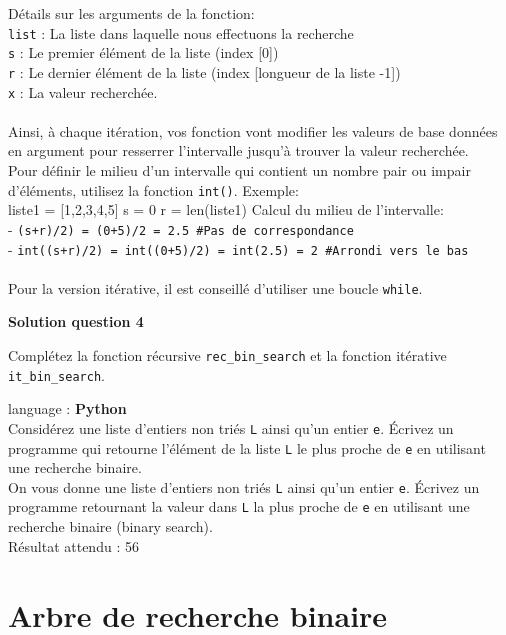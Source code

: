 \begin{Exercice}[10-15 minutes]
\begin{conseil}
        Détails sur les arguments de la fonction:\\
        \lstinline{list} : La liste dans laquelle nous effectuons la recherche\\
        \lstinline{s} : Le premier élément de la liste (index [0])\\
        \lstinline{r} : Le dernier élément de la liste (index [longueur de la liste -1])\\
        \lstinline{x} : La valeur recherchée.\\\\

        Ainsi, à chaque itération, vos fonction vont modifier les valeurs de base données en argument pour resserrer l'intervalle jusqu'à trouver la valeur recherchée.\\        
        Pour définir le milieu d'un intervalle qui contient un nombre pair ou impair d'éléments, utilisez la fonction \lstinline{int()}. Exemple:\\
        liste1 = [1,2,3,4,5]
        s = 0 \quad r = len(liste1)
        Calcul du milieu de l'intervalle:\\
        - \lstinline{(s+r)/2) = (0+5)/2 = 2.5 #Pas de correspondance}\\
        - \lstinline{int((s+r)/2) = int((0+5)/2) = int(2.5) = 2 #Arrondi vers le bas}\\\\
        
        Pour la version itérative, il est conseillé d'utiliser une boucle \lstinline{while}.

    \end{conseil}

    \textbf{Solution question 4}

    Complétez la fonction récursive \lstinline{rec_bin_search} et la fonction itérative \lstinline{it_bin_search}. 
    
    


\end{Exercice}


\begin{Exercice}[10 minutes] language : \textbf{Python}\\

Considérez une liste d’entiers non triés \lstinline{L} ainsi qu’un entier \lstinline{e}. Écrivez un programme qui retourne l'élément de la liste \lstinline{L} le plus proche de \lstinline{e} en utilisant une recherche binaire.\\

On vous donne une liste d’entiers non triés \lstinline{L} ainsi qu’un entier \lstinline{e}. Écrivez un programme retournant la valeur dans \lstinline{L} la plus proche de \lstinline{e} en utilisant une recherche binaire (binary search).\\

Résultat attendu : 56\\

\end{Exercice}



\newpage
\section{Arbre de recherche binaire}



